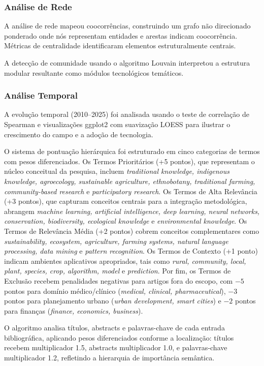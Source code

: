 \subsubsection{Análise de Rede}

A análise de rede mapeou coocorrências, construindo um grafo não direcionado ponderado onde nós representam entidades e arestas indicam coocorrência. Métricas de centralidade identificaram elementos estruturalmente centrais.

A detecção de comunidade usando o algoritmo Louvain interpretou a estrutura modular resultante como módulos tecnológicos temáticos.

\subsubsection{Análise Temporal}

A evolução temporal (2010–2025) foi analisada usando o teste de correlação de Spearman e visualizações ggplot2 com suavização LOESS para ilustrar o crescimento do campo e a adoção de tecnologia.

O sistema de pontuação hierárquica foi estruturado em cinco categorias de termos com pesos diferenciados. Os Termos Prioritários (+5 pontos), que representam o núcleo conceitual da pesquisa, incluem \textit{traditional knowledge, indigenous knowledge, agroecology, sustainable agriculture, ethnobotany, traditional farming, community-based research} e \textit{participatory research}. Os Termos de Alta Relevância (+3 pontos), que capturam conceitos centrais para a integração metodológica, abrangem \textit{machine learning, artificial intelligence, deep learning, neural networks, conservation, biodiversity, ecological knowledge} e \textit{environmental knowledge}. Os Termos de Relevância Média (+2 pontos) cobrem conceitos complementares como \textit{sustainability, ecosystem, agriculture, farming systems, natural language processing, data mining} e \textit{pattern recognition}. Os Termos de Contexto (+1 ponto) indicam ambientes aplicativos apropriados, tais como \textit{rural, community, local, plant, species, crop, algorithm, model} e \textit{prediction}. Por fim, os Termos de Exclusão recebem penalidades negativas para artigos fora do escopo, com $-5$ pontos para domínio médico/clínico (\textit{medical, clinical, pharmaceutical}), $-3$ pontos para planejamento urbano (\textit{urban development, smart cities}) e $-2$ pontos para finanças (\textit{finance, economics, business}).

O algoritmo analisa títulos, abstracts e palavras-chave de cada entrada bibliográfica, aplicando pesos diferenciados conforme a localização: títulos recebem multiplicador 1.5, abstracts multiplicador 1.0, e palavras-chave multiplicador 1.2, refletindo a hierarquia de importância semântica.

